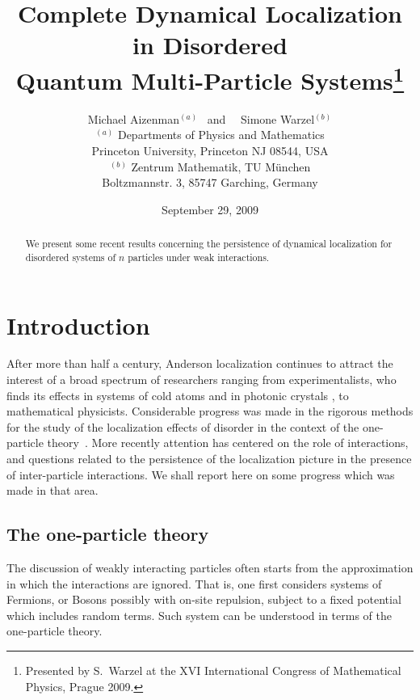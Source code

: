 \documentclass[reqno,keywordsasfootnote]{article}
\date{September 29, 2009}
\numberwithin{equation}{section}
\theoremstyle{definition}
\begin{document}
\title{\LARGE Complete Dynamical Localization in Disordered\\  
Quantum Multi-Particle Systems\footnote{
Presented by S.~Warzel at the XVI International Congress of Mathematical Physics,  Prague 2009.} 
}

\author{   \Large Michael Aizenman$^{(a)}$   \   and   \  \  
 Simone Warzel$^{(b)}$
  \\[2ex]    
{ $^{(a)}$ Departments of Physics and Mathematics }  \\
{ Princeton University,  Princeton NJ 08544, USA  } \\[2ex]
{ $^ {(b)}$  Zentrum Mathematik, TU M\"unchen}\\ 
{   Boltzmannstr. 3, 85747 Garching, Germany} 
\\[1ex]     
  }

\maketitle

\begin{abstract}
We present some recent results concerning the persistence of dynamical localization for disordered systems of $ n $ particles under weak 
interactions.
\end{abstract}

\section{Introduction}\label{aba:sec1}

After more than half a century, Anderson localization continues to attract the interest of a broad spectrum of researchers ranging from experimentalists, 
who finds its effects in  systems of cold atoms and in photonic crystals \cite{AI09}, to mathematical physicists.  
Considerable progress was made in the rigorous methods for  the study of the localization effects of disorder in the context of the one-particle theory~\cite{St00,Kis,AiWa_RSO}.  
 More recently attention has centered on the role of interactions, and questions related to the persistence of the localization picture in the presence of inter-particle interactions.   We shall report here on some progress which was made in that area.

\subsection{The one-particle theory} 

The discussion of weakly interacting particles often starts  from the approximation in which the interactions are ignored.  That is, one first considers systems of Fermions, or Bosons possibly with on-site repulsion, subject to a fixed potential which includes random terms.   Such system can be understood in terms of the one-particle theory.  
\end{document}
